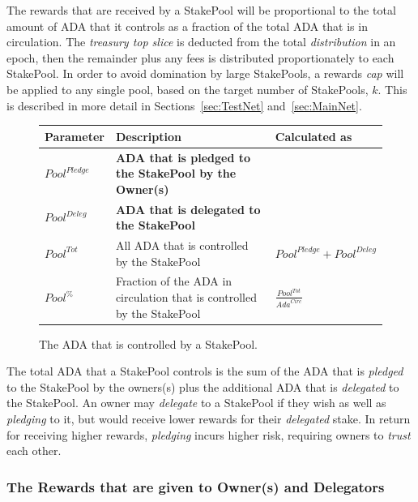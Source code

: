 \documentclass[11pt,a4paper,dvipsnames,twosided,final]{article}
\newcommand{\khcomment}[1]{\todo[color=blue!20]{KH: #1}}
\newcommand{\ada}{ADA{}}
\begin{document}
The rewards that are received by a StakePool will be proportional to the total amount of \ada{} that it controls
as a fraction of the total \ada{} that is in circulation.  The \emph{treasury top slice} is deducted from the total \emph{distribution}
in an epoch, then the remainder plus any fees is distributed proportionately to each StakePool.  In order to avoid domination by large StakePools,
a rewards \emph{cap} will be applied to any single pool, based on the target number of StakePools, $k$.
This is described in more detail in Sections~\ref{sec:TestNet} and~\ref{sec:MainNet}.

\clearpage
\begin{figure}[h!]
\begin{center}
\begin{tabular}{||l|p{9cm}|l||}
  \hline \hline
\textbf{Parameter} & \textbf{Description} & \textbf{Calculated as} \\\hline
\textbf{\color{red} ${\textit{Pool}}^\textit{Pledge}$} & \textbf{\color{red} \ada{} that is pledged to the StakePool by the Owner(s)} & \\\hline
\textbf{\color{blue} ${\textit{Pool}}^\textit{Deleg}$} & \textbf{\color{blue}  \ada{} that is delegated to the StakePool} & \\\hline
${\textit{Pool}}^{Tot}$ & All \ada{} that is controlled by the StakePool & ${\textit{Pool}}^\textit{Pledge} + {\textit{Pool}}^\textit{Deleg}$ \\\hline
${\textit{Pool}}^\%$ & Fraction of the \ada{} in circulation that is controlled by the StakePool & {\large $\frac{{\textit{Pool}}^{Tot}}{\textit{Ada}^{\textit{Circ}}}$} \\\hline
  \hline
\end{tabular}
\end{center}
\caption{The \ada{} that is controlled by a StakePool.}
\end{figure}

\noindent
The total \ada{} that a StakePool controls is the sum of the \ada{} that is \emph{pledged} to the StakePool by the owners(s) plus
the additional \ada{} that is \emph{delegated} to the StakePool.  An owner may \emph{delegate} to a StakePool if
they wish as well as \emph{pledging} to it, but would receive lower rewards for their \emph{delegated} stake.
In return for receiving higher rewards, \emph{pledging} incurs higher risk, requiring owners to \emph{trust} each other.


\subsubsection*{The Rewards that are given to Owner(s) and Delegators}
\end{document}
